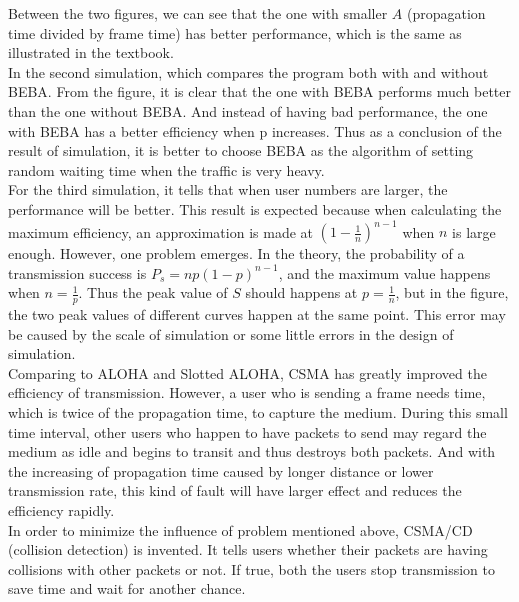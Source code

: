 \documentclass[11pt,a4paper]{report}
\begin{document}
Between the two figures, we can see that the one with smaller \(A\) (propagation time divided by frame time) has better performance, which is the same as illustrated in the textbook. \\

In the second simulation, which compares the program both with and without BEBA. From the figure, it is clear that the one with BEBA performs much better than the one without BEBA. And instead of having bad performance, the one with BEBA has a better efficiency when p increases. Thus as a conclusion of the result of simulation, it is better to choose BEBA as the algorithm of setting random waiting time when the traffic is very heavy. \\

For the third simulation, it tells that when user numbers are larger, the performance will be better. This result is expected because when calculating the maximum efficiency, an approximation is made at \((1-\frac{1}{n})^{n-1}\) when \(n\) is large enough. However, one problem emerges. In the theory, the probability of a transmission success is \(P_s = np(1-p)^{n-1}\), and the maximum value happens when \(n = \frac{1}{p}\). Thus the peak value of \(S\) should happens at \(p = \frac{1}{n}\), but in the figure, the two peak values of different curves happen at the same point. This error may be caused by the scale of simulation or some little errors in the design of simulation. \\

Comparing to ALOHA and Slotted ALOHA, CSMA has greatly improved the efficiency of transmission. However, a user who is sending a frame needs time, which is twice of the propagation time, to capture the medium. During this small time interval, other users who happen to have packets to send may regard the medium as idle and begins to transit and thus destroys both packets. And with the increasing of propagation time caused by longer distance or lower transmission rate, this kind of fault will have larger effect and reduces the efficiency rapidly. \\

In order to minimize the influence of problem mentioned above, CSMA/CD (collision detection) is invented. It tells users whether their packets are having collisions with other packets or not. If true, both the users stop transmission to save time and wait for another chance.
\end{document}
